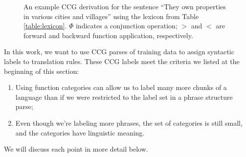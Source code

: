 \documentclass[a4paper]{article}
\begin{document}
\begin{figure}
\centering
{}
\caption{An example CCG derivation for the sentence ``They own properties in various cities and villages'' using the lexicon from Table \ref{table:lexicon}. $\Phi$ indicates a conjunction operation; $>$ and $<$ are forward and backward function application, respectively.\label{fig:ccg-derivation}}
\end{figure}

In this work, we want to use CCG parses of training data to assign syntactic labels to translation rules. These CCG labels meet the criteria we listed at the beginning of this section:
\begin{enumerate}
\item Using function categories can allow us to label many more chunks of a language than if we were restricted to the label set in a phrase structure parse;
\item Even though we're labeling more phrases, the set of categories is still small, and the categories have linguistic meaning.
\end{enumerate}
We will discuss each point in more detail below.
\end{document}

